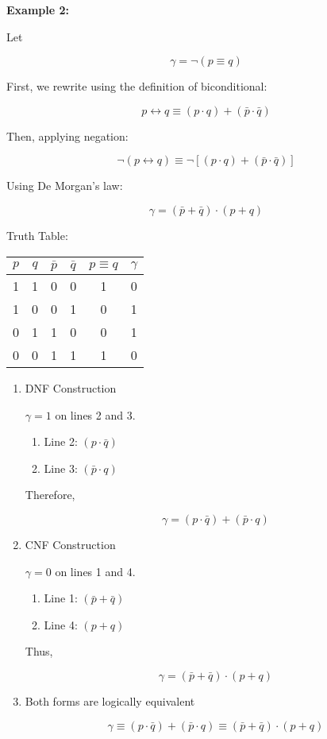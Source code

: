 \documentclass[12pt,a4paper,openany]{article}
\begin{document}
\textbf{Example 2:}

Let

$$\gamma = \neg(p \equiv q)$$

First, we rewrite using the definition of biconditional:

$$p \leftrightarrow q \equiv (p \cdot q) + (\bar{p} \cdot \bar{q})$$

Then, applying negation:

$$
\neg(p \leftrightarrow q) \equiv \neg[(p \cdot q) + (\bar{p} \cdot \bar{q})]
$$

Using De Morgan's law:

$$
\gamma = (\bar{p} + \bar{q}) \cdot (p + q)
$$

Truth Table: 

\begin{center}
\begin{tabular}{|c|c|c|c|c|c|}
\hline
$p$ & $q$ & $\bar p$ & $\bar q$ & $p \equiv q$ & $\gamma$ \\
\hline
1 & 1 & 0 & 0 & 1 & 0 \\
\hline
1 & 0 & 0 & 1 & 0 & 1 \\
\hline
0 & 1 & 1 & 0 & 0 & 1 \\
\hline
0 & 0 & 1 & 1 & 1 & 0 \\
\hline
\end{tabular}
\end{center}

\begin{enumerate}
\item DNF Construction

  $\gamma = 1$ on lines 2 and 3.

  \begin{enumerate}
  \item Line 2: $(p \cdot \bar{q})$
  \item Line 3: $(\bar{p} \cdot q)$
  \end{enumerate}

  Therefore,

  $$
   \gamma = (p \cdot \bar{q}) + (\bar{p} \cdot q)
   $$
\item CNF Construction

  $\gamma = 0$ on lines 1 and 4.

  \begin{enumerate}
  \item Line 1: $(\bar{p} + \bar{q})$
  \item Line 4: $(p + q)$
  \end{enumerate}

  Thus,

  $$
   \gamma = (\bar{p} + \bar{q}) \cdot (p + q)
   $$
\item Both forms are logically equivalent

  $$
   \gamma \equiv (p \cdot \bar{q}) + (\bar{p} \cdot q) \equiv (\bar{p} + \bar{q}) \cdot (p + q)
   $$
\end{enumerate}
\end{document}
